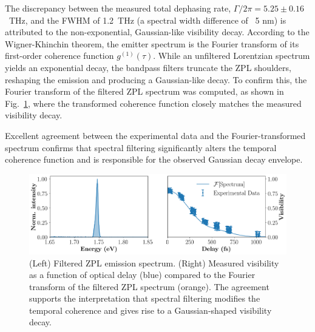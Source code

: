 The discrepancy between the measured total dephasing rate, $\Gamma/2\pi = 5.25 \pm 0.16$~THz, and the FWHM of 1.2~THz (a spectral width difference of ~5 nm) is attributed to the non-exponential, Gaussian-like visibility decay. According to the Wigner-Khinchin theorem, the emitter spectrum is the Fourier transform of its first-order coherence function $g^{(1)}(\tau)$. While an unfiltered Lorentzian spectrum yields an exponential decay, the bandpass filters truncate the ZPL shoulders, reshaping the emission and producing a Gaussian-like decay. To confirm this, the Fourier transform of the filtered ZPL spectrum was computed, as shown in Fig.~\ref{fig:FT-spec}, where the transformed coherence function closely matches the measured visibility decay.

Excellent agreement between the experimental data and the Fourier-transformed spectrum confirms that spectral filtering significantly alters the temporal coherence function and is responsible for the observed Gaussian decay envelope.

\begin{figure}[h]
    \centering
    \includegraphics[width=1\linewidth]{Figures/FTSpec.png}
    \caption{(Left) Filtered ZPL emission spectrum. (Right) Measured visibility as a function of optical delay (blue) compared to the Fourier transform of the filtered ZPL spectrum (orange). The agreement supports the interpretation that spectral filtering modifies the temporal coherence and gives rise to a Gaussian-shaped visibility decay.}
    \label{fig:FT-spec}
\end{figure}

